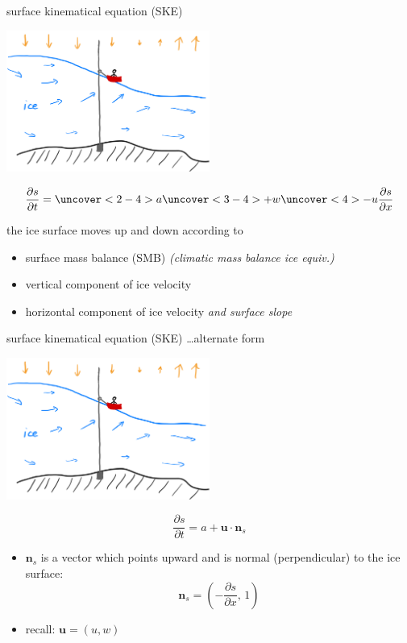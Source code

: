 \documentclass[10pt,dvipsnames]{beamer}
\newcommand{\bn}{\mathbf{n}}
\newcommand{\bu}{\mathbf{u}}
\newcommand{\comm}[1]{{\footnotesize \hfill \emph{#1}}}
\begin{document}
\begin{frame}{surface kinematical equation (SKE)}
\begin{center}
\includegraphics[width=0.5\textwidth]{boatplus}
\end{center}

\vspace{-5mm}
\begin{equation*}
\frac{\partial s}{\partial t} = \uncover<2-4>{a} \uncover<3-4>{+w} \uncover<4>{-u \frac{\partial s}{\partial x}}
\end{equation*}

the ice surface moves up and down according to
\begin{itemize}
\item<2-4> surface mass balance (SMB) \comm{(\emph{climatic} mass balance ice equiv.)}
\item<3-4> vertical component of ice velocity
\item<4> horizontal component of ice velocity \emph{and surface slope}
\end{itemize}
\end{frame}

\begin{frame}{surface kinematical equation (SKE) \dots alternate form}
\begin{center}
\includegraphics[width=0.5\textwidth]{boatplus}
\end{center}

\vspace{-5mm}
\begin{equation*}
\frac{\partial s}{\partial t} = a + \bu \cdot \bn_s
\end{equation*}

\begin{itemize}
\item $\bn_s$ is a vector which points upward and is normal (perpendicular) to the ice surface:
	$$\bn_s = \left(-\frac{\partial s}{\partial x}, \,1\right)$$
\item recall: $\bu=(u,w)$
\end{itemize}
\end{frame}
\end{document}
